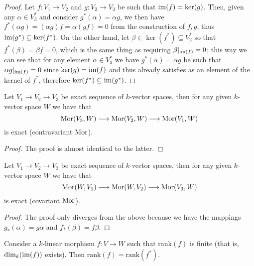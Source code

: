 \begin{proof}
  Let \(f: V_1 \to V_2\) and \(g: V_2 \to V_3\) be such that \(\operatorname{im}(f) =
  \ker(g)\). Then, given any \(\alpha \in V_3^\ast\) and consider
  \(g^\ast(\alpha) = \alpha  g\), we then have \(f^\ast(\alpha  g) =
  (\alpha  g)  f = \alpha  (g  f) = 0\) from the
  construction of \(f, g\), thus \(\operatorname{im}(g^\ast) \subseteq \ker(f^\ast)\). On the
  other hand, let \(\beta \in \ker(f^\ast) \subseteq V_2^\ast\) so that
  \(f^\ast(\beta) = \beta  f = 0\), which is the same thing as requiring
  \(\beta|_{\operatorname{im}(f)} = 0\); this way we can see that for any element \(\alpha \in
  V_3^\ast\) we have \(g^\ast(\alpha) = \alpha  g\) be such that \(\alpha
   g|_{\operatorname{im}(f)} = 0\) since \(\ker(g) = \operatorname{im}(f)\) and thus already satisfies
  as an element of the kernel of \(f^\ast\), therefore \(\ker(f^\ast) \subseteq
  \operatorname{im}(g^\ast)\).
\end{proof}

\begin{proposition}
  Let \(V_1 \to V_2 \to V_3\) be exact sequence of \(k\)-vector spaces, then for
  any given \(k\)-vector space \(W\) we have that
  \[
    \operatorname{Mor}(V_3, W) \longrightarrow \operatorname{Mor}(V_2, W) \longrightarrow \operatorname{Mor}(V_1, W)
  \]
  is exact (contravariant \(\operatorname{Mor}\)).
\end{proposition}

\begin{proof}
  The proof is almost identical to the latter.
\end{proof}

\begin{proposition}
  Let \(V_1 \to V_2 \to V_3\) be exact sequence of \(k\)-vector spaces, then for
  any given \(k\)-vector space \(W\) we have that
  \[
    \operatorname{Mor}(W, V_1) \longrightarrow \operatorname{Mor}(W, V_2) \longrightarrow \operatorname{Mor}(V_3, W)
  \]
  is exact (covariant \(\operatorname{Mor}\)).
\end{proposition}

\begin{proof}
  The proof only diverges from the above because we have the mappings
  \(g_\ast(\alpha) = g  \alpha\) and \(f_\ast(\beta) = f  \beta\).
\end{proof}

\begin{proposition}
  Consider a \(k\)-linear morphism \(f : V \to W\) such that \(\mathrm{rank}(f)\) is
  finite (that is, \(\dim_k(\operatorname{im}(f))\) exists). Then \(\mathrm{rank}(f) =
  \mathrm{rank}(f^\ast)\).
\end{proposition}

